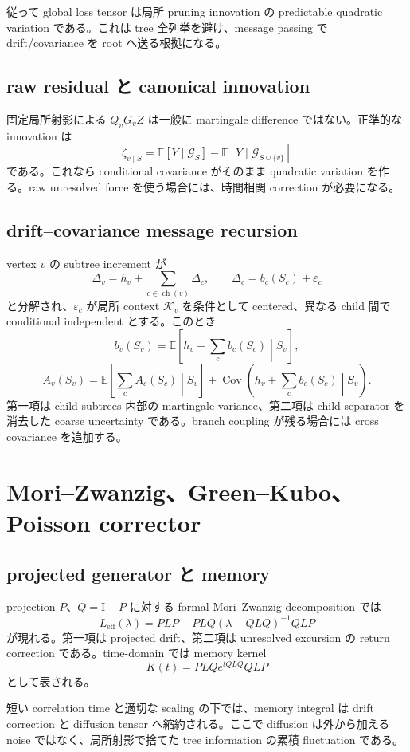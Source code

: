 \documentclass[11pt,a4paper,openany]{book}
\numberwithin{equation}{chapter}
\newcommand{\E}{\mathbb E}
\newcommand{\Cov}{\operatorname{Cov}}
\newcommand{\cG}{\mathcal G}
\newcommand{\cK}{\mathcal K}
\newcommand{\Id}{\mathrm I}
\begin{document}
従って global loss tensor は局所 pruning innovation の predictable quadratic variation である。これは tree 全列挙を避け、message passing で drift/covariance を root へ送る根拠になる。

\section{raw residual と canonical innovation}
固定局所射影による $Q_vG_vZ$ は一般に martingale difference ではない。正準的な innovation は
\[
\zeta_{v\mid S}
=\E[Y\mid\cG_S]-\E[Y\mid\cG_{S\cup\{v\}}]
\]
である。これなら conditional covariance がそのまま quadratic variation を作る。raw unresolved force を使う場合には、時間相関 correction が必要になる。

\section{drift--covariance message recursion}
vertex $v$ の subtree increment が
\[
\Delta_v=h_v+\sum_{c\in\operatorname{ch}(v)}\Delta_c,
\qquad
\Delta_c=b_c(S_c)+\varepsilon_c
\]
と分解され、$\varepsilon_c$ が局所 context $\cK_v$ を条件として centered、異なる child 間で conditional independent とする。このとき
\[
b_v(S_v)
=\E\left[h_v+\sum_cb_c(S_c)\middle|S_v\right],
\]
\[
\boxed{
A_v(S_v)
=\E\left[\sum_cA_c(S_c)\middle|S_v\right]
+\Cov\left(h_v+\sum_cb_c(S_c)\middle|S_v\right).}
\]
第一項は child subtrees 内部の martingale variance、第二項は child separator を消去した coarse uncertainty である。branch coupling が残る場合には cross covariance を追加する。

\chapter{Mori--Zwanzig、Green--Kubo、Poisson corrector}
\section{projected generator と memory}
projection $P$、$Q=\Id-P$ に対する formal Mori--Zwanzig decomposition では
\[
L_{\mathrm{eff}}(\lambda)
=PLP+PLQ(\lambda-QLQ)^{-1}QLP
\]
が現れる。第一項は projected drift、第二項は unresolved excursion の return correction である。time-domain では memory kernel
\[
K(t)=PLQe^{tQLQ}QLP
\]
として表される。

短い correlation time と適切な scaling の下では、memory integral は drift correction と diffusion tensor へ縮約される。ここで diffusion は外から加える noise ではなく、局所射影で捨てた tree information の累積 fluctuation である。
\end{document}

